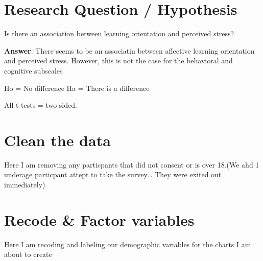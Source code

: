 \documentclass[]{article}
\newenvironment{Shaded}{\begin{snugshade}}{\end{snugshade}}
\newcommand{\KeywordTok}[1]{\textcolor[rgb]{0.13,0.29,0.53}{\textbf{#1}}}
\newcommand{\DecValTok}[1]{\textcolor[rgb]{0.00,0.00,0.81}{#1}}
\newcommand{\StringTok}[1]{\textcolor[rgb]{0.31,0.60,0.02}{#1}}
\newcommand{\CommentTok}[1]{\textcolor[rgb]{0.56,0.35,0.01}{\textit{#1}}}
\newcommand{\OperatorTok}[1]{\textcolor[rgb]{0.81,0.36,0.00}{\textbf{#1}}}
\newcommand{\NormalTok}[1]{#1}
\begin{document}
\section{Research Question /
Hypothesis}\label{research-question-hypothesis}

Is there an association between learning orientation and perceived
stress?

\textbf{Answer}: There seems to be an associatin between affective
learning orientation and perceived stress. However, this is not the case
for the behavioral and cognitive subscales

Ho = No difference Ha = There is a difference

All t-tests = two sided.

\section{Clean the data}\label{clean-the-data}

Here I am removing any particpants that did not consent or is over
18.(We ahd 1 underage particpant attept to take the survey\ldots{} They
were exited out immediately)

\begin{Shaded}
\end{Shaded}

\section{Recode \& Factor variables}\label{recode-factor-variables}

Here I am recoding and labeling our demographic variables for the charts
I am about to create
\end{document}
